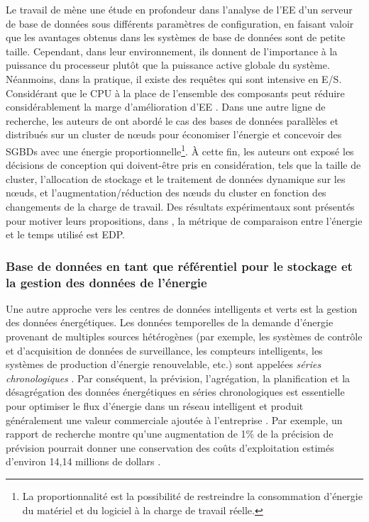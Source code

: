 Le travail de \cite{Tsirogiannis10} mène une étude en profondeur dans l'analyse de l'EE d'un serveur de base de données sous différents paramètres de configuration, en faisant valoir que les avantages obtenus dans les systèmes de base de données sont de petite taille. Cependant, dans leur environnement, ils donnent de l'importance à la puissance du processeur plutôt que la puissance active globale du système. Néanmoins, dans la pratique, il existe des requêtes qui sont intensive en E/S. Considérant que le CPU à la place de l'ensemble des composants peut réduire considérablement la marge d'amélioration d'EE \cite{Wang11}.
Dans une autre ligne de recherche, les auteurs de \cite{Lang12, Schall14} ont abordé le cas des bases de données parallèles et distribués sur un cluster de nœuds pour économiser l'énergie et concevoir des SGBDs avec une énergie proportionnelle\footnote{La proportionnalité est la possibilité de restreindre la consommation d'énergie du matériel et du logiciel à la charge de travail réelle.}. À cette fin, les auteurs ont exposé les décisions de conception qui doivent-être pris en considération, tels que la taille de cluster, l'allocation de stockage et le traitement de données dynamique sur les nœuds, et l'augmentation/réduction des nœuds du cluster en fonction des changements de la charge de travail. Des résultats expérimentaux sont présentés pour motiver leurs propositions, dans \cite{Lang12}, la métrique de comparaison entre l'énergie et le temps utilisé est EDP.

\subsubsection{Base de données en tant que référentiel pour le stockage et la gestion des données de l'énergie}
Une autre approche vers les centres de données intelligents et verts est la gestion des données énergétiques. Les données temporelles de la demande d'énergie provenant de multiples sources hétérogènes (par exemple, les systèmes de contrôle et d'acquisition de données de surveillance, les compteurs intelligents, les systèmes de production d'énergie renouvelable, etc.) sont appelées \textit{séries chronologiques} \cite{Fusco16}. Par conséquent, la prévision, l'agrégation, la planification et la désagrégation des données énergétiques en séries chronologiques est essentielle pour optimiser le flux d'énergie dans un réseau intelligent et produit généralement une valeur commerciale ajoutée à l'entreprise \cite{Silipo13}. Par exemple, un rapport de recherche montre qu'une augmentation de 1\% de la précision de prévision pourrait donner une conservation des coûts d'exploitation estimés d'environ 14,14 millions de dollars \cite{Silipo13}.

